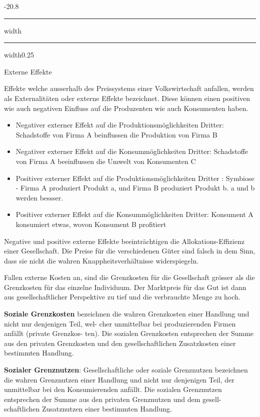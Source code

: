 \documentclass[9pt, landscape, fleqn]{scrartcl}
\makeatletter
\renewcommand{\subsection}{\@startsection{subsection}{1}{0mm}%
{-2\baselineskip}{0.8\baselineskip}%
{\hrule depth 0.2pt width\columnwidth\hrule depth0.75pt
width0.25\columnwidth\vspace*{1.2em}\large\bfseries\rmfamily}}
\makeatother
\begin{document}
\begin{multicols*}{3}
\subsection{Externe Effekte}

Effekte welche ausserhalb des Preissystems einer Volkswirtschaft anfallen, werden als Externalitäten oder externe Effekte bezeichnet. Diese können einen positiven wie auch negativen Einfluss auf die Produzenten wie auch Konsumenten haben.

\begin{itemize}
    \item Negativer externer Effekt auf die Produktionsmöglichkeiten Dritter: Schadstoffe von Firma A beinflussen die Produktion von Firma B
    \item Negativer externer Effekt auf die Konsummöglichkeiten Dritter: Schadstoffe von Firma A beeinflussen die Umwelt von Konsumenten C
    \item Positiver externer Effekt auf die Produktionsmöglichkeiten Dritter : Symbiose - Firma A produziert Produkt a, und Firma B produziert Produkt b. a und b werden bessser.
    \item Positiver externer Effekt auf die Konsummöglichkeiten Dritter: Konsument A konsumiert etwas, wovon Konsument B profitiert
\end{itemize}

Negative und positive externe Effekte beeinträchtigen die Allokations-Effizienz einer Gesellschaft. Die Preise für die verschiedenen Güter sind falsch in dem Sinn, dass sie nicht die wahren Knappheitsverhältnisse widerspiegeln. \newline 

Fallen externe Kosten an, sind die Grenzkosten für die Gesellschaft grösser als die Grenzkosten für das einzelne Individuum. Der Marktpreis für das Gut ist dann aus gesellschaftlicher Perspektive zu tief und die verbrauchte Menge zu hoch. \newline

\textbf{Soziale Grenzkosten} bezeichnen die wahren Grenzkosten einer Handlung und nicht nur denjenigen Teil, wel- cher unmittelbar bei produzierenden Firmen anfällt (private Grenzkos- ten). Die sozialen Grenzkosten entsprechen der Summe aus den privaten Grenzkosten und den gesellschaftlichen Zusatzkosten einer bestimmten Handlung. \newline

\textbf{Sozialer Grenznutzen}: Gesellschaftliche oder soziale Grenznutzen bezeichnen die wahren Grenznutzen einer Handlung und nicht nur denjenigen Teil, der unmittelbar bei den Konsumierenden anfällt. Die sozialen Grenznutzen entsprechen der Summe aus den privaten Grenznutzen und dem gesell- schaftlichen Zusatznutzen einer bestimmten Handlung. \newline 


\end{multicols*}
\end{document}
